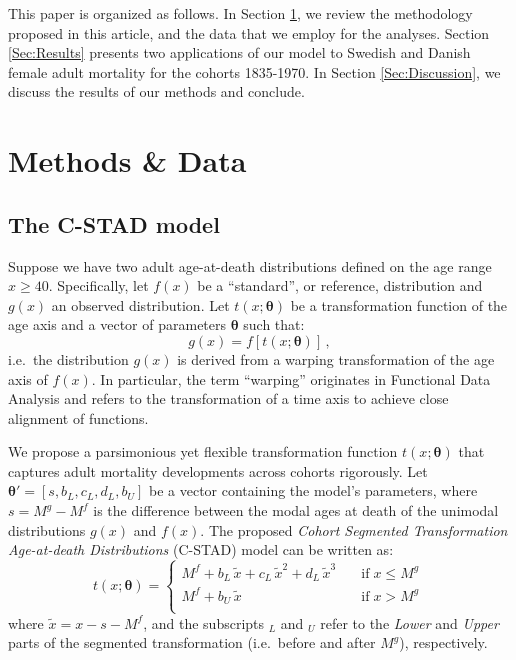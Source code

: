\documentclass[11pt, a4paper]{article}
\begin{document}
This paper is organized as follows. In Section \ref{Sec:Methods}, we review the methodology proposed in this article, and the data that we employ for the analyses. Section \ref{Sec:Results} presents two applications of our model to Swedish and Danish female adult mortality for the cohorts 1835-1970. In Section \ref{Sec:Discussion}, we discuss the results of our methods and conclude. 

\section{Methods \& Data}
\label{Sec:Methods}
\subsection{The C-STAD model}
\label{Subsec:C-STADmodel}
Suppose we have two adult age-at-death distributions defined on the age range $x \geq 40$. Specifically, let $f(x)$ be a ``standard'', or reference, distribution and $g(x)$ an observed distribution. Let $t(x;\bm{\theta})$ be a transformation function of the age axis and a vector of parameters $\bm{\theta}$ such that:
\begin{equation}\label{Eq:gxftx}
g(x) = f\left[t(x;\bm{\theta})\right]\,, 
\end{equation}  
i.e.~the distribution $g(x)$ is derived from a warping transformation of the age axis of $f(x)$. In particular, the term ``warping'' originates in Functional Data Analysis \citep{ramsay2005FDA} and refers to the transformation of a time axis to achieve close alignment of functions. \par

We propose a parsimonious yet flexible transformation function $t(x;\bm{\theta})$ that captures adult mortality developments across cohorts rigorously. Let $\bm{\theta}' = \left[s,b_{L},c_{L},d_{L},b_{U}\right]$ be a vector containing the model's parameters, where $s = M^{g} - M^{f}$ is the difference between the modal ages at death of the unimodal distributions $g(x)$ and $f(x)$. The proposed \emph{Cohort Segmented Transformation Age-at-death Distributions} (C-STAD) model can be written as: 
\begin{equation}\label{Eq:tx}
t(x;\bm{\theta}) = \left\{ \begin{array}{ll}
M^{f} + b_{L}\,\tilde{x} + c_{L}\,\tilde{x}^2 + d_{L}\,\tilde{x}^3 \quad & \mathrm{if} \; x \leq M^{g} \, \\
M^{f} + b_{U}\,\tilde{x} \quad & \mathrm{if} \; x > M^{g} \\
\end{array}
\right.
\end{equation} 
where $\tilde{x}=x - s - M^{f}$, and the subscripts $_L$ and $_U$ refer to the \textit{Lower} and \textit{Upper} parts of the segmented transformation (i.e.~before and after $M^{g}$), respectively. \par
\end{document}
